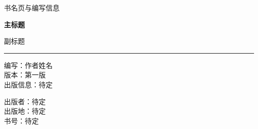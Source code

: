 \documentclass[UTF8,zihao=-4,a4paper,twoside,openany,fontset=none]{ctexbook}
\begin{document}
\begin{titlepage}
  \thispagestyle{empty}
  \vspace*{15mm}
  {\color{bookgray}\small 书名页与编写信息}\par
  \vspace{8mm}
  \begin{flushright}
    {\color{bookink}\fontsize{28}{36}\selectfont\bfseries 主标题\par}
    \vspace{3mm}
    {\color{bookgray}\fontsize{15}{22}\selectfont 副标题\par}
  \end{flushright}
  \vspace{10mm}
  \noindent\color{bookline}\rule{\linewidth}{0.5pt}\par
  \vspace{8mm}
  \begin{flushleft}
    \small\color{bookgray}
    编写：作者姓名\\[2mm]
    版本：第一版\\[2mm]
    出版信息：待定
  \end{flushleft}
  \vfill
  \begin{flushleft}
    \small\color{bookgray}
    出版者：待定\\
    出版地：待定\\
    书号：待定
  \end{flushleft}
\end{titlepage}
\fi



\bookcontents

\mainmatter

\end{document}
